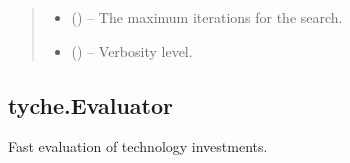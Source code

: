\documentclass[letterpaper,10pt,english]{sphinxmanual}
\begin{document}
\begin{fulllineitems}
\begin{fulllineitems}
\begin{quote}
\begin{description}
\begin{itemize}
\item {} 
\sphinxAtStartPar
{} () – The maximum iterations for the search.

\item {} 
\sphinxAtStartPar
{} () – Verbosity level.

\end{itemize}

\end{description}\end{quote}

\end{fulllineitems}


\end{fulllineitems}



\subsection{tyche.Evaluator}
\label{\detokenize{tyche:module-tyche.Evaluator}}\label{\detokenize{tyche:tyche-evaluator}}
\sphinxAtStartPar
Fast evaluation of technology investments.
\end{document}
